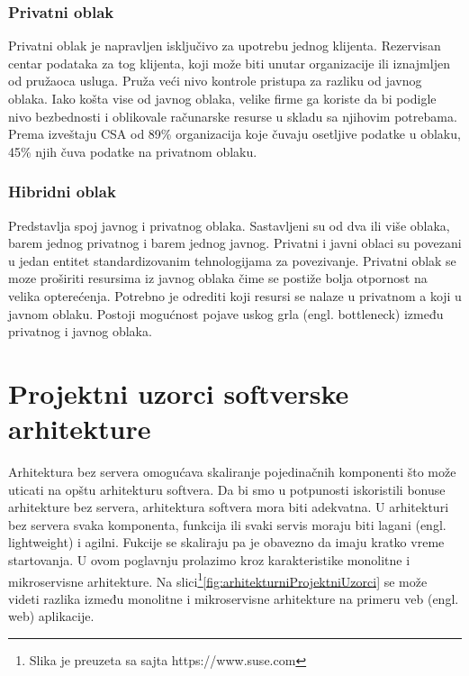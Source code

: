 \documentclass[12pt,oneside]{memoir}
\begin{document}
 
\subsubsection{Privatni oblak}
Privatni oblak je napravljen isključivo za upotrebu jednog klijenta. Rezervisan centar podataka za tog klijenta, koji može biti unutar organizacije ili iznajmljen od pružaoca usluga. Pruža veći nivo kontrole pristupa za razliku od javnog oblaka. Iako košta vise od javnog oblaka, velike firme ga koriste da bi podigle nivo bezbednosti i oblikovale računarske resurse u skladu sa njihovim potrebama. Prema izveštaju CSA od 89\% organizacija koje čuvaju osetljive podatke u oblaku, 45\% njih čuva podatke na privatnom oblaku\cite{csa}.
 
\subsubsection{Hibridni oblak}
Predstavlja spoj javnog i privatnog oblaka. Sastavljeni su od dva ili više oblaka, barem jednog privatnog i barem jednog javnog. Privatni i javni oblaci su povezani u jedan entitet standardizovanim tehnologijama za povezivanje. Privatni oblak se moze proširiti resursima iz javnog oblaka čime se postiže bolja otpornost na velika opterećenja. Potrebno je odrediti koji resursi se nalaze u privatnom a koji u javnom oblaku. Postoji mogućnost pojave uskog grla (engl. bottleneck) između privatnog i javnog oblaka.


\section{Projektni uzorci softverske arhitekture}
Arhitektura bez servera omogućava skaliranje pojedinačnih komponenti što može uticati na opštu arhitekturu softvera. Da bi smo u potpunosti iskoristili bonuse arhitekture bez servera, arhitektura softvera mora biti adekvatna. U arhitekturi bez servera svaka komponenta, funkcija ili svaki servis moraju biti lagani (engl. lightweight) i agilni. Fukcije se skaliraju pa je obavezno da imaju kratko vreme startovanja. U ovom poglavnju prolazimo kroz karakteristike monolitne i mikroservisne arhitekture. Na slici\footnote{Slika je preuzeta sa sajta https://www.suse.com}\ref{fig:arhitekturniProjektniUzorci} se može videti razlika između monolitne i mikroservisne arhitekture na primeru veb (engl. web) aplikacije.
\end{document}
